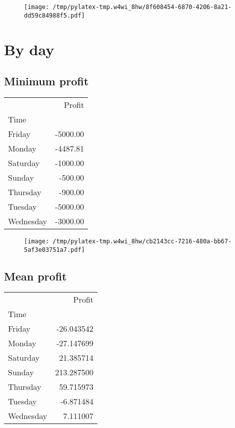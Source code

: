 \documentclass{article}%
\begin{document}
\begin{figure}[htbp]%
\centering%
\texttt{[image: /tmp/pylatex-tmp.w4wi\_8hw/8f608454-6870-4206-8a21-dd59c84988f5.pdf]}%
\end{figure}

%
\newpage %
\section{By day}%
\label{sec:Byday}%
\subsection{Minimum profit }%
\label{subsec:Minimumprofit}%
\begin{tabular}{lr}
\toprule
{} &   Profit \\
Time      &          \\
\midrule
Friday    & -5000.00 \\
Monday    & -4487.81 \\
Saturday  & -1000.00 \\
Sunday    &  -500.00 \\
Thursday  &  -900.00 \\
Tuesday   & -5000.00 \\
Wednesday & -3000.00 \\
\bottomrule
\end{tabular}
%


\begin{figure}[htbp]%
\centering%
\texttt{[image: /tmp/pylatex-tmp.w4wi\_8hw/cb2143cc-7216-480a-bb67-5af3e03751a7.pdf]}%
\end{figure}

%
\newpage %
\subsection{Mean profit }%
\label{subsec:Meanprofit}%
\begin{tabular}{lr}
\toprule
{} &      Profit \\
Time      &             \\
\midrule
Friday    &  -26.043542 \\
Monday    &  -27.147699 \\
Saturday  &   21.385714 \\
Sunday    &  213.287500 \\
Thursday  &   59.715973 \\
Tuesday   &   -6.871484 \\
Wednesday &    7.111007 \\
\bottomrule
\end{tabular}
%
\end{document}
